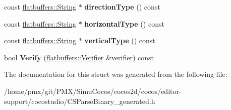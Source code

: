 \begin{DoxyCompactItemize}
const \hyperlink{structflatbuffers_1_1String}{flatbuffers\+::\+String} $\ast$ {\bfseries direction\+Type} () const
\item 
\mbox{\label{structflatbuffers_1_1ListViewOptions_a9a7d5b9b35a91b77dcf43b977cca8b79}} 
const \hyperlink{structflatbuffers_1_1String}{flatbuffers\+::\+String} $\ast$ {\bfseries horizontal\+Type} () const
\item 
\mbox{\label{structflatbuffers_1_1ListViewOptions_abcb35ecfcaaac3e0449b4b121af7a845}} 
const \hyperlink{structflatbuffers_1_1String}{flatbuffers\+::\+String} $\ast$ {\bfseries vertical\+Type} () const
\item 
\mbox{\label{structflatbuffers_1_1ListViewOptions_ac5d9f6b414497eadc5e126cbc2c02658}} 
bool {\bfseries Verify} (\hyperlink{classflatbuffers_1_1Verifier}{flatbuffers\+::\+Verifier} \&verifier) const
\end{DoxyCompactItemize}


The documentation for this struct was generated from the following file\+:\begin{DoxyCompactItemize}
\item 
/home/pmx/git/\+P\+M\+X/\+Simu\+Cocos/cocos2d/cocos/editor-\/support/cocostudio/C\+S\+Parse\+Binary\+\_\+generated.\+h\end{DoxyCompactItemize}
